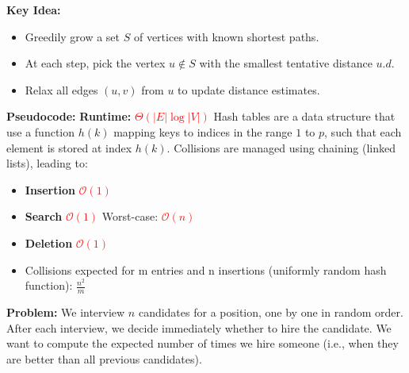\documentclass[a4paper,landscape]{article}
\newcommand{\timecomplexity}[1]{\textcolor{red}{#1}}
\newcommand{\bigo}{\mathcal{O}}
\begin{document}
\begin{multicols}{7}
\textbf{Key Idea:}
\begin{itemize}[noitemsep, topsep=0pt]
    \item Greedily grow a set $S$ of vertices with known shortest paths.
    \item At each step, pick the vertex $u \notin S$ with the smallest tentative distance $u.d$.
    \item Relax all edges $(u, v)$ from $u$ to update distance estimates.
\end{itemize}
\textbf{Pseudocode:}
\textbf{Runtime:} \timecomplexity{$\Theta(|E| \log |V|)$}
\endtcolorbox
\tcolorbox[mybox={HTable}]
Hash tables are a data structure that use a function $h(k)$ mapping keys to indices in the range $1$ to $p$, such that each element is stored at index $h(k)$.  
Collisions are managed using chaining (linked lists), leading to:
\begin{itemize}
  \item \textbf{Insertion} \timecomplexity{$\bigo(1)$}
  \item \textbf{Search} \timecomplexity{$\bigo(1)$} Worst-case: \timecomplexity{$\bigo(n)$}
  \item \textbf{Deletion} \timecomplexity{$\bigo(1)$ }
  \item Collisions expected for m entries and n insertions (uniformly random hash function): \(\frac{n^2}{m}\)
\end{itemize}
\endtcolorbox

\tcolorbox[mybox={The Hiring Problem}]
\textbf{Problem:} We interview $n$ candidates for a position, one by one in random order. After each interview, we decide immediately whether to hire the candidate. We want to compute the expected number of times we hire someone (i.e., when they are better than all previous candidates).



\end{multicols}
\end{document}
